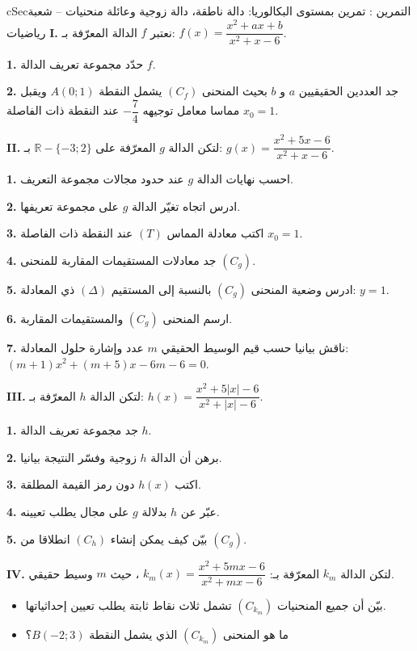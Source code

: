 \documentclass[12pt,a4paper]{article}
\newenvironment{BOX}[2]{\begin{otherlanguage}{english}\begin{arbox}{#1}{#2}}{\end{arbox}\end{otherlanguage}}
\newcounter{exo}
\newenvironment{tamrin}[1]{\stepcounter{exo}\begin{BOX}{cSec}{التمرين \theexo: #1}}{\end{BOX}}
\newcommand{\R}{\mathbb{R}}
\newcommand{\QQ}[1]{\par\smallskip\textbf{#1.} }
\begin{document}
\begin{tamrin}{تمرين بمستوى البكالوريا: دالة ناطقة، دالة زوجية وعائلة منحنيات -- شعبة رياضيات}
\textbf{I.} نعتبر $f$ الدالة المعرّفة بـ: $f(x)=\dfrac{x^{2}+ax+b}{x^{2}+x-6}$.
\QQ{1} حدّد مجموعة تعريف الدالة $f$.
\QQ{2} جد العددين الحقيقيين $a$ و $b$ بحيث المنحنى $(C_f)$ يشمل النقطة $A(0;1)$ ويقبل مماسا معامل توجيهه $-\dfrac74$ عند النقطة ذات الفاصلة $x_0=1$.

\textbf{II.} لتكن الدالة $g$ المعرّفة على $\R-\{-3;2\}$ بـ: $g(x)=\dfrac{x^{2}+5x-6}{x^{2}+x-6}$.
\QQ{1} احسب نهايات الدالة $g$ عند حدود مجالات مجموعة التعريف.
\QQ{2} ادرس اتجاه تغيّر الدالة $g$ على مجموعة تعريفها.
\QQ{3} اكتب معادلة المماس $(T)$ عند النقطة ذات الفاصلة $x_0=1$.
\QQ{4} جد معادلات المستقيمات المقاربة للمنحنى $(C_g)$.
\QQ{5} ادرس وضعية المنحنى $(C_g)$ بالنسبة إلى المستقيم $(\Delta)$ ذي المعادلة: $y=1$.
\QQ{6} ارسم المنحنى $(C_g)$ والمستقيمات المقاربة.
\QQ{7} ناقش بيانيا حسب قيم الوسيط الحقيقي $m$ عدد وإشارة حلول المعادلة: \ $(m+1)x^{2}+(m+5)x-6m-6=0$.

\textbf{III.} لتكن الدالة $h$ المعرّفة بـ: $h(x)=\dfrac{x^{2}+5|x|-6}{x^{2}+|x|-6}$.
\QQ{1} جد مجموعة تعريف الدالة $h$.
\QQ{2} برهن أن الدالة $h$ زوجية وفسّر النتيجة بيانيا.
\QQ{3} اكتب $h(x)$ دون رمز القيمة المطلقة.
\QQ{4} عبّر عن $h$ بدلالة $g$ على مجال يطلب تعيينه.
\QQ{5} بيّن كيف يمكن إنشاء $(C_h)$ انطلاقا من $(C_g)$.

\textbf{IV.} لتكن الدالة $k_m$ المعرّفة بـ: $k_m(x)=\dfrac{x^{2}+5mx-6}{x^{2}+mx-6}$ ، حيث $m$ وسيط حقيقي.
\begin{itemize}[label=$\star$]
\item بيّن أن جميع المنحنيات $(C_{k_m})$ تشمل ثلاث نقاط ثابتة يطلب تعيين إحداثياتها.
\item ما هو المنحنى $(C_{k_m})$ الذي يشمل النقطة $B(-2;3)$؟
\end{itemize}
\end{tamrin}
\end{document}
